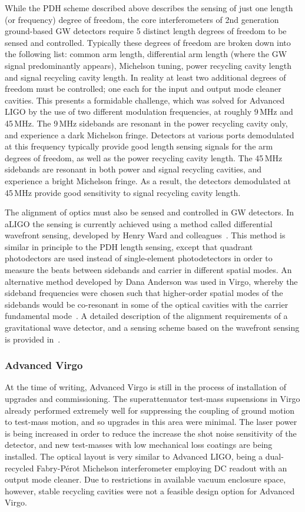 While the PDH scheme described above describes the sensing of just one length (or frequency) degree of freedom, 
the core interferometers of 2nd generation ground-based GW detectors require 5 distinct length degrees of freedom to 
be sensed and controlled. Typically these degrees of freedom are broken down into the following list: common arm length, 
differential arm length (where the GW signal predominantly appears), Michelson tuning, power recycling cavity length and 
signal recycling cavity length. In reality at least two additional degrees of freedom must be controlled; one each for the input 
and output mode cleaner cavities. This presents a formidable challenge, which was solved for Advanced LIGO by the use of two 
different modulation frequencies, at roughly 9\,MHz and 45\,MHz. The 9\,MHz sidebands are resonant in the power recycling 
cavity only, and experience a dark Michelson fringe. Detectors at various ports demodulated at this frequency typically provide 
good length sensing signals for the arm degrees of freedom, as well as the power recycling cavity length. The 45\,MHz sidebands 
are resonant in both power and signal recycling cavities, and experience a bright Michelson fringe. As a result, the detectors demodulated 
at 45\,MHz provide good sensitivity to signal recycling cavity length.

The alignment of optics must also be sensed and controlled in GW detectors. In aLIGO the sensing is currently achieved using a method 
called differential wavefront sensing, developed by Henry Ward and colleagues~\cite{Morrison1994, Morrison1994b}. 
This method is similar in principle to the PDH length sensing, 
except that quadrant photodectors are used 
instead of single-element photodetectors in order to measure the beats between sidebands and carrier in different spatial modes. An 
alternative method developed by Dana Anderson was used in Virgo, whereby the sideband frequencies were chosen such that higher-order 
spatial modes of the sidebands would be co-resonant in some of the optical cavities with the carrier fundamental mode~\cite{Anderson1984}. 
A detailed description of the alignment requirements of a gravitational wave detector, and a sensing scheme based on the wavefront sensing 
is provided in~\cite{Fritschel1998}.

\subsubsection{Advanced Virgo}
At the time of writing, Advanced Virgo is still in the process of installation of upgrades and commissioning. 
The superattenuator test-mass supsensions in Virgo already performed extremely well for suppressing the coupling of ground motion 
to test-mass motion, and so upgrades in this area were minimal. The laser power is being increased in order to reduce the increase the shot 
noise sensitivity of the detector, and new test-masses with low mechanical loss coatings are being installed. The optical layout is 
very similar to Advanced LIGO, being a dual-recycled Fabry-P\'{e}rot Michelson interferometer employing DC readout with an output mode cleaner. 
Due to restrictions in available vacuum enclosure space, however, stable recycling cavities were not a feasible design option for Advanced Virgo. 

